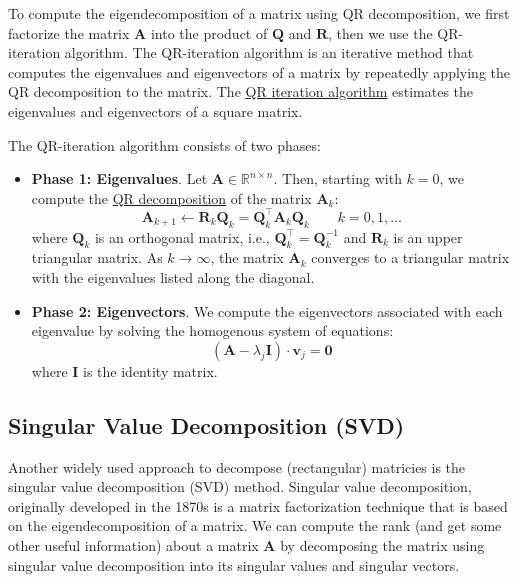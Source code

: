 \documentclass{article}[11pt]
\begin{document}
To compute the eigendecomposition of a matrix using QR decomposition, we first factorize the matrix $\mathbf{A}$ into the product of $\mathbf{Q}$ and $\mathbf{R}$, 
then we use the QR-iteration algorithm. The QR-iteration algorithm is an iterative method that computes the eigenvalues and eigenvectors of a matrix by repeatedly applying the QR decomposition to the matrix.
The \href{https://en.wikipedia.org/wiki/QR_algorithm}{QR iteration algorithm} estimates the eigenvalues and eigenvectors of a square matrix.
\begin{mdframed}
The QR-iteration algorithm consists of two phases:
\begin{itemize}[leftmargin=16pt]
\item{\textbf{Phase 1: Eigenvalues}. Let $\mathbf{A}\in\mathbb{R}^{n\times{n}}$. 
Then, starting with $k = 0$, we compute the \href{https://en.wikipedia.org/wiki/QR_decomposition}{QR decomposition} of the matrix $\mathbf{A}_{k}$:
\begin{equation*}
\mathbf{A}_{k+1}\leftarrow\mathbf{R}_{k}\mathbf{Q}_{k} = \mathbf{Q}_{k}^{\top}\mathbf{A}_{k}\mathbf{Q}_{k}\qquad{k=0,1,\dots} 
\end{equation*}
where $\mathbf{Q}_{k}$ is an orthogonal matrix, i.e., $\mathbf{Q}^{\top}_{k} = \mathbf{Q}^{-1}_{k}$ and $\mathbf{R}_{k}$ is an upper triangular matrix. 
As $k\rightarrow\infty$, the matrix $\mathbf{A}_{k}$ converges to a triangular matrix with the eigenvalues listed along the diagonal.}
\item{\textbf{Phase 2: Eigenvectors}. We compute the eigenvectors associated with each eigenvalue by solving the homogenous system of equations:
\begin{equation*}
\left(\mathbf{A}-\lambda_{j}\mathbf{I}\right)\cdot\mathbf{v}_{j} = \mathbf{0}
\end{equation*}
where $\mathbf{I}$ is the identity matrix.}
\end{itemize}
\end{mdframed}

\subsection{Singular Value Decomposition (SVD)}
Another widely used approach to decompose (rectangular) matricies is the singular value decomposition (SVD) method.
Singular value decomposition, originally developed in the 1870s \citep{Stewart:1993} is a matrix factorization technique that is based on the eigendecomposition of a matrix.
We can compute the rank (and get some other useful information) about a matrix $\mathbf{A}$ by decomposing the matrix using singular value decomposition into its singular values and singular vectors.
\end{document}
